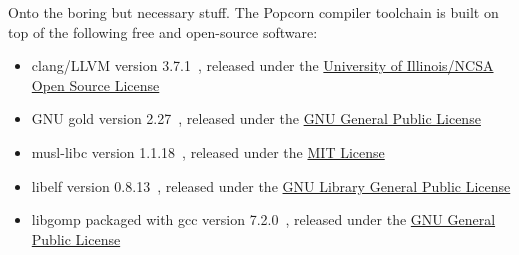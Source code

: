 \documentclass{article}
\begin{document}
Onto the boring but necessary stuff.  The Popcorn compiler toolchain is built on top of the following free and open-source software:

\begin{itemize}
	\item clang/LLVM version 3.7.1~\cite{1281665}, released under the \href{http://llvm.org/docs/DeveloperPolicy.html#license}{University of Illinois/NCSA Open Source License}
	\item GNU gold version 2.27~\cite{binutils}, released under the \href{https://www.gnu.org/licenses/gpl.html}{GNU General Public License}
	\item musl-libc version 1.1.18~\cite{musl-libc}, released under the \href{http://git.musl-libc.org/cgit/musl/tree/COPYRIGHT}{MIT License}
	\item libelf version 0.8.13~\cite{libelf}, released under the \href{http://www.mr511.de/software/COPYING.LIB-2.0}{GNU Library General Public License}
	\item libgomp packaged with gcc version 7.2.0~\cite{libgomp}, released under the \href{https://www.gnu.org/licenses/gpl.html}{GNU General Public License}
\end{itemize}

\end{document}
